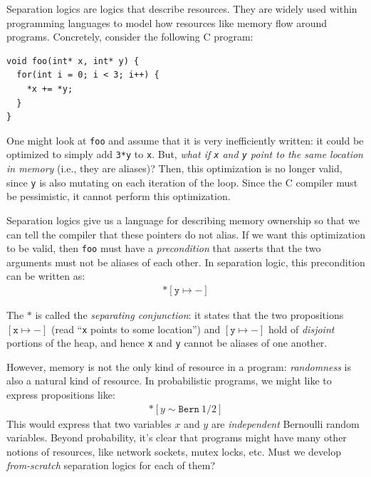 Separation logics are logics that describe resources. They are widely 
used within programming languages to model how resources like memory
flow around programs. Concretely, consider the following C program:

\begin{lstlisting}[mathescape=true]
void foo(int* x, int* y) {
  for(int i = 0; i < 3; i++) {
    *x += *y;
  }
}
\end{lstlisting}

One might look at \texttt{foo} and assume that it is very inefficiently written:
it could be optimized to simply add \texttt{3*y} to \texttt{x}.  But, \emph{what
if \texttt{x} and \texttt{y} point to the same location in memory} (i.e., they
are aliases)? Then, this optimization is no longer valid, since
\texttt{y} is also mutating on each iteration of the loop. Since the C compiler 
must be pessimistic, it cannot perform this optimization.

Separation logics give us a language for describing memory ownership so that 
we can tell the compiler that these pointers do not alias. If we 
want this optimization to be valid, then  \texttt{foo} must have a
\emph{precondition} that asserts that the two arguments 
must not be aliases of each other. In separation logic, this precondition 
can be written as:
\begin{align*}
  [\texttt{x} \mapsto -] * [\texttt{y} \mapsto -]
\end{align*}

The $*$ is called the \emph{separating conjunction}: it states that the two
propositions $[\texttt{x} \mapsto -]$ (read ``\texttt{x} points to some 
location'') and $[\texttt{y} \mapsto -]$ hold of \emph{disjoint} portions of the
heap, and hence \texttt{x} and \texttt{y} cannot be aliases of one another.

However, memory is not the only kind of resource in a program: \emph{randomness}
is also a natural kind of resource. In probabilistic programs, we might like to 
express propositions like:
\begin{align*}
  [x \sim \texttt{Bern}~1/2] * [y \sim \texttt{Bern}~1/2]
\end{align*}
This would express that two variables $x$ and $y$ are \emph{independent}
Bernoulli random variables.
Beyond probability, it's clear that programs might have many other notions of
resources, like network sockets, mutex locks, etc. Must we develop
\emph{from-scratch} separation logics for each of them?

